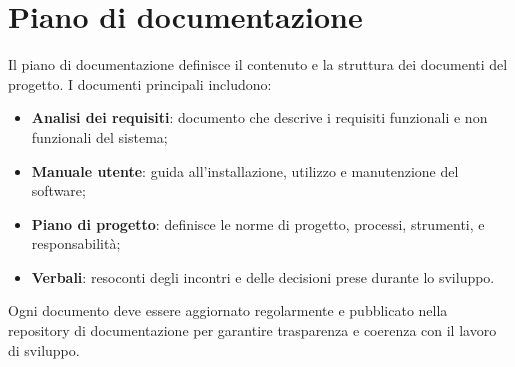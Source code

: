 \section{Piano di documentazione}

Il piano di documentazione definisce il contenuto e la struttura dei documenti del progetto. I documenti principali includono:
\begin{itemize}
  \item \textbf{Analisi dei requisiti}: documento che descrive i requisiti funzionali e non funzionali del sistema;
  \item \textbf{Manuale utente}: guida all'installazione, utilizzo e manutenzione del software;
  \item \textbf{Piano di progetto}: definisce le norme di progetto, processi, strumenti, e responsabilità;
  \item \textbf{Verbali}: resoconti degli incontri e delle decisioni prese durante lo sviluppo.
\end{itemize}

Ogni documento deve essere aggiornato regolarmente e pubblicato nella repository di documentazione per garantire trasparenza e coerenza con il lavoro di sviluppo.
